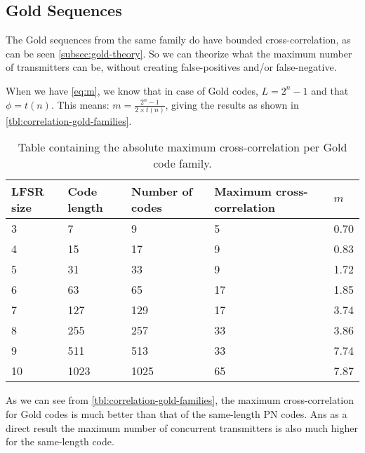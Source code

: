 	\subsection{Gold Sequences}

		The Gold sequences from the same family do have bounded cross-correlation, as can be seen \autoref{subsec:gold-theory}.
		So we can theorize what the maximum number of transmitters can be, without creating false-positives and/or false-negative.

		When we have \autoref{eq:m}, we know that in case of Gold codes, $L = 2^n - 1$ and that $\phi = t(n)$.
		This means: $m = \frac{2^n - 1}{2 \times t(n)}$, giving the results as shown in \autoref{tbl:correlation-gold-families}.


		\begin{table}[h]
			\centering
			\begin{tabular}{ | l | l | l | l | l | }

				\hline
				LFSR size 	& Code length	& Number of codes 	& Maximum cross-correlation & $m$	\\ \hline

				3			& 7				& 9					& 5							& 0.70	\\ \hline
				4			& 15			& 17				& 9							& 0.83	\\ \hline
				5			& 31			& 33				& 9							& 1.72	\\ \hline
				6			& 63			& 65				& 17						& 1.85	\\ \hline
				7			& 127			& 129				& 17						& 3.74	\\ \hline
				8			& 255			& 257				& 33						& 3.86	\\ \hline
				9			& 511			& 513				& 33						& 7.74	\\ \hline
				10			& 1023			& 1025				& 65						& 7.87	\\ \hline	
				

			\end{tabular}
			\caption{Table containing the absolute maximum cross-correlation per Gold code family.}
			\label{tbl:correlation-gold-families}
		\end{table}

		As we can see from \autoref{tbl:correlation-gold-families}, the maximum cross-correlation for Gold codes is much better than that of the same-length PN codes.
		Ans as a direct result the maximum number of concurrent transmitters is also much higher for the same-length code.


